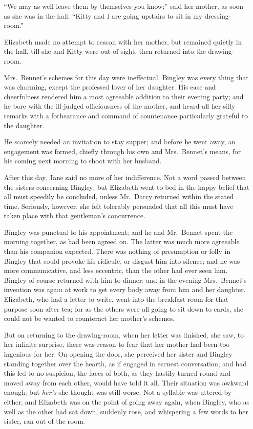 ``We may as well leave them by themselves you know;'' said her
mother, as soon as she was in the hall.  ``Kitty and I are going
upstairs to sit in my dressing-room.''

Elizabeth made no attempt to reason with her mother, but
remained quietly in the hall, till she and Kitty were out of
sight, then returned into the drawing-room.

Mrs.\ Bennet's schemes for this day were ineffectual.  Bingley
was every thing that was charming, except the professed lover
of her daughter.  His ease and cheerfulness rendered him a
most agreeable addition to their evening party; and he bore
with the ill-judged officiousness of the mother, and heard all
her silly remarks with a forbearance and command of countenance
particularly grateful to the daughter.

He scarcely needed an invitation to stay supper; and before he
went away, an engagement was formed, chiefly through his own
and Mrs.\ Bennet's means, for his coming next morning to shoot
with her husband.

After this day, Jane said no more of her indifference.
Not a word passed between the sisters concerning Bingley;
but Elizabeth went to bed in the happy belief that all must
speedily be concluded, unless Mr.\ Darcy returned within the
stated time.  Seriously, however, she felt tolerably persuaded
that all this must have taken place with that gentleman's
concurrence.

Bingley was punctual to his appointment; and he and Mr.\ Bennet
spent the morning together, as had been agreed on.  The latter
was much more agreeable than his companion expected.  There was
nothing of presumption or folly in Bingley that could provoke
his ridicule, or disgust him into silence; and he was more
communicative, and less eccentric, than the other had ever seen
him.  Bingley of course returned with him to dinner; and in the
evening Mrs.\ Bennet's invention was again at work to get every
body away from him and her daughter.  Elizabeth, who had a
letter to write, went into the breakfast room for that purpose
soon after tea; for as the others were all going to sit down to
cards, she could not be wanted to counteract her mother's
schemes.

But on returning to the drawing-room, when her letter was
finished, she saw, to her infinite surprise, there was
reason to fear that her mother had been too ingenious for
her.  On opening the door, she perceived her sister and
Bingley standing together over the hearth, as if engaged in
earnest conversation; and had this led to no suspicion, the
faces of both, as they hastily turned round and moved away
from each other, would have told it all.  Their situation
was awkward enough; but \emph{her's} she thought was still worse.
Not a syllable was uttered by either; and Elizabeth was on
the point of going away again, when Bingley, who as well as
the other had sat down, suddenly rose, and whispering a few
words to her sister, ran out of the room.

